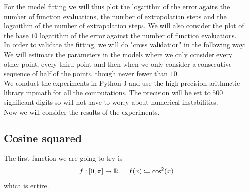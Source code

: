 For the model fitting we will thus plot the logarithm of the error agains the number of function evaluations, the number of extrapolation steps and the logarithm of the number of extrapolation steps. We will also consider the plot of the base \(10\) logarithm of the error against the number of function evaluations.\\

In order to validate the fitting, we will do "cross validation" in the following way: We will estimate the parameters in the models where we only consider every other point, every third point and then when we only consider a consecutive sequence of half of the points, though never fewer than \(10\).\\ 

We conduct the experiments in Python 3 and use the high precision arithmetic library mpmath for all the computations. The precision will be set to \(500\) significant digits so will not have to worry about numerical instabilities.\\

Now we will consider the results of the experiments.

\subsection{Cosine squared}
The first function we are going to try is
\[
f: [0, \pi]\rightarrow \mathbb{R}, \quad f(x) \coloneqq \cos^2(x)
\]
which is entire.

